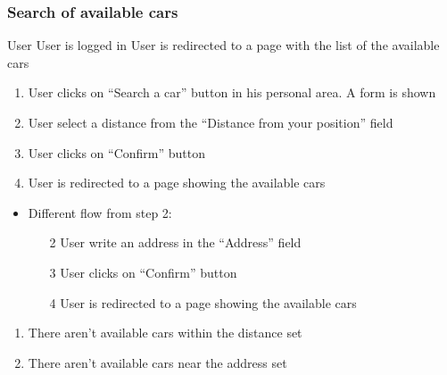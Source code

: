 \subsubsection{Search of available cars}\label{search}
{User}
{}
{User is logged in}
{User is redirected to a page with the list of the available cars}
{
\begin{enumerate}
	\item User clicks on ``Search a car'' button in his personal area. A form is shown
	\item User select a distance from the ``Distance from your position'' field
	\item User clicks on ``Confirm'' button
	\item User is redirected to a page showing the available cars
\end{enumerate}
}
{
\begin{itemize}
\item Different flow from step 2:
	\begin{enumerate}
	\item[2] User write an address in the ``Address'' field 
	\item[3] User clicks on ``Confirm'' button
	\item[4] User is redirected to a page showing the available cars
 
\end{enumerate}

\end{itemize}


}
{
\begin{enumerate}
\item There aren't available cars within the distance set 
\item There aren't available cars near the address set
\end{enumerate}
}
\pagebreak

